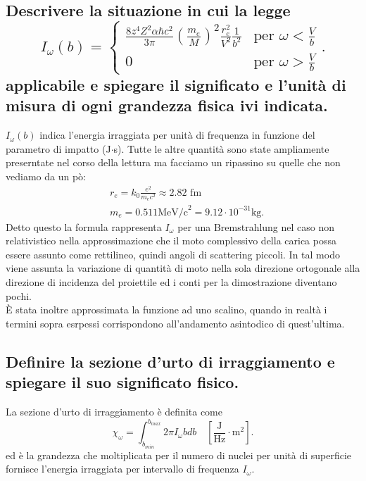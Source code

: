 \subsection[]{Descrivere la situazione in cui la legge
\[
	I_{\omega}\left( b \right) = 
	\begin{cases}
		\frac{8z^4Z^2 \alpha \hbar c^2}{3\pi} \left( \frac{m_e}{M} \right) ^2 \frac{r^2_e}{V^2} \frac{1}{b ^2}  & \text{per } \omega<\frac{V}{b}\\
		0 & \text{per } \omega> \frac{V}{b}
	\end{cases}
.\] 
applicabile e spiegare il significato e l'unità di misura di ogni grandezza fisica ivi indicata.
}\label{sec:4.a.12}
$I_{\omega}\left( b \right) $ indica l'energia irraggiata per unità di frequenza in funzione del parametro di impatto (J$\cdot$s). Tutte le altre quantità sono state ampliamente preserntate nel corso della lettura ma facciamo un ripassino su quelle che non vediamo da un pò:
\begin{align*}
	&r_e = k_0 \frac{e^2}{m_e c^2} \approx 2.82 \text{ fm}\\
	&m_e = 0.511 \text{MeV/c}^2 = 9.12 \cdot 10^{-31} \text{kg}
.\end{align*}
Detto questo la formula rappresenta $I_{\omega}$ per una Bremstrahlung nel caso non relativistico nella approssimazione che il moto complessivo della carica possa essere assunto come rettilineo, quindi angoli di scattering piccoli. In tal modo viene assunta la variazione di quantità di moto nella sola direzione ortogonale alla direzione di incidenza del proiettile ed i conti per la dimostrazione diventano pochi.\\
È stata inoltre approssimata la funzione ad uno scalino, quando in realtà i termini sopra esrpessi corrispondono all'andamento asintodico di quest'ultima.

\subsection[]{Definire la sezione d'urto di irraggiamento e spiegare il suo significato fisico.
}\label{sec:4.a.13}
La sezione d'urto di irraggiamento è definita come
\[
	\chi_{\omega}= \int_{b_{min}}^{b_{max}} 2\pi I_{\omega}b db \quad \left[ \frac{\text{J}}{\text{Hz}}\cdot \text{m}^2 \right] 
.\] 
ed è la grandezza che moltiplicata per il numero di nuclei per unità di superficie fornisce l'energia irraggiata per intervallo di frequenza $I_{\omega}$.


